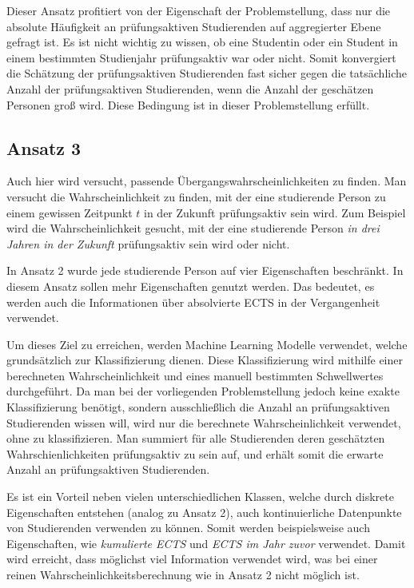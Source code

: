 Dieser Ansatz profitiert von der Eigenschaft der Problemstellung, dass nur die absolute H\"aufigkeit an pr\"ufungsaktiven Studierenden auf aggregierter Ebene
gefragt ist. Es ist nicht wichtig zu wissen, ob eine Studentin oder ein Student in einem bestimmten Studienjahr pr\"ufungsaktiv war oder nicht.
Somit konvergiert die Sch\"atzung der pr\"ufungsaktiven Studierenden
fast sicher gegen die tats\"achliche Anzahl der pr\"ufungsaktiven Studierenden, wenn die Anzahl der gesch\"atzen Personen gro{\ss} wird. Diese Bedingung ist in dieser Problemstellung
erf\"ullt. \\







\subsection{Ansatz 3}
\label{sec:appr3}

Auch hier wird versucht, passende \"Ubergangswahrscheinlichkeiten zu finden. Man versucht die Wahrscheinlichkeit zu finden, mit der eine studierende Person zu einem
gewissen Zeitpunkt $t$ in der Zukunft pr\"ufungsaktiv sein wird.
Zum Beispiel wird die Wahrscheinlichkeit gesucht, mit der eine studierende Person \textit{in drei Jahren in der Zukunft} pr\"ufungsaktiv sein wird oder nicht.


In Ansatz 2 wurde jede studierende Person auf vier Eigenschaften beschr\"ankt.
In diesem Ansatz sollen mehr Eigenschaften genutzt werden. Das bedeutet, es werden auch die Informationen
\"uber absolvierte ECTS in der Vergangenheit verwendet.


Um dieses Ziel zu erreichen, werden Machine Learning Modelle verwendet, welche grunds\"atzlich zur Klassifizierung dienen.
Diese Klassifizierung wird mithilfe einer berechneten Wahrscheinlichkeit und eines manuell bestimmten Schwellwertes durchgef\"uhrt.
Da man bei der vorliegenden Problemstellung jedoch keine exakte Klassifizierung ben\"otigt, sondern ausschlie{\ss}lich die Anzahl an
pr\"ufungsaktiven Studierenden wissen will, wird nur die berechnete Wahrscheinlichkeit verwendet, ohne zu klassifizieren. Man summiert f\"ur alle 
Studierenden deren gesch\"atzten Wahrschienlichkeiten pr\"ufungsaktiv zu sein auf, und erh\"alt somit die erwarte Anzahl an pr\"ufungsaktiven Studierenden.

Es ist ein Vorteil neben vielen unterschiedlichen Klassen, welche durch diskrete Eigenschaften entstehen (analog zu Ansatz 2), auch kontinuierliche Datenpunkte von
Studierenden verwenden zu k\"onnen. Somit werden beispielsweise auch Eigenschaften, wie \textit{\glqq kumulierte ECTS\grqq{}} und \textit{\glqq ECTS im Jahr zuvor\grqq{}} verwendet. Damit wird erreicht, dass
m\"oglichst viel Information verwendet wird, was bei einer reinen Wahrscheinlichkeitsberechnung wie in Ansatz 2 nicht m\"oglich ist.

